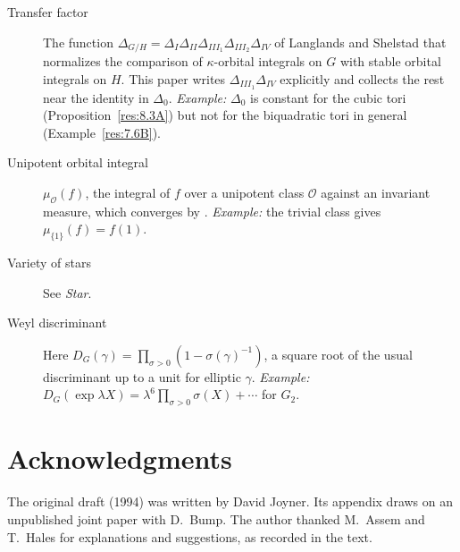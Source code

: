 \documentclass[12pt,letterpaper]{amsart}
\theoremstyle{plain}
\theoremstyle{definition}
\theoremstyle{remark}
\theoremstyle{definition}
\begin{document}
\begin{description}
\item[Transfer factor] The function $\Delta_{G/H}=\Delta_I\Delta_{II}
\Delta_{III_1}\Delta_{III_2}\Delta_{IV}$ of Langlands and Shelstad \cite{LS87}
that normalizes the comparison of $\kappa$-orbital integrals on $G$ with stable
orbital integrals on $H$. This paper writes $\Delta_{III_1}\Delta_{IV}$
explicitly and collects the rest near the identity in $\Delta_0$.
\emph{Example:} $\Delta_0$ is constant for the cubic tori
(Proposition~\ref{res:8.3A}) but not for the biquadratic tori in general
(Example~\ref{res:7.6B}).

\item[Unipotent orbital integral] $\mu_{\mathcal O}(f)$, the integral of $f$
over a unipotent class $\mathcal O$ against an invariant measure, which
converges by \cite{Ra72}. \emph{Example:} the trivial class gives
$\mu_{\{1\}}(f)=f(1)$.

\item[Variety of stars] See \emph{Star}.

\item[Weyl discriminant] Here $D_G(\gamma)=\prod_{\sigma>0}(1-\sigma(\gamma)^{-1})$,
a square root of the usual discriminant up to a unit for elliptic $\gamma$.
\emph{Example:} $D_G(\exp\lambda X)=\lambda^6\prod_{\sigma>0}\sigma(X)+\cdots$
for $G_2$.
\end{description}

\section*{Acknowledgments}\label{sec:ack}

The original draft (1994) was written by David Joyner. Its appendix draws on
an unpublished joint paper with D.~Bump. The author thanked M.~Assem and
T.~Hales for explanations and suggestions, as recorded in the text.
\end{document}
